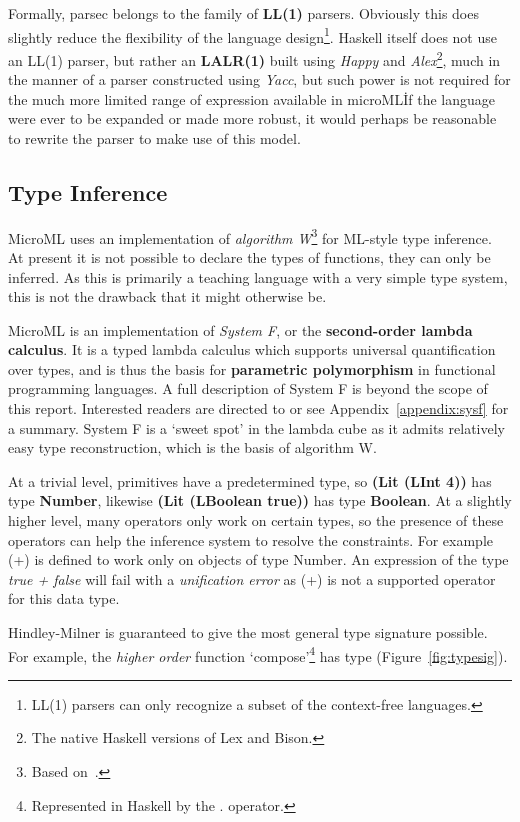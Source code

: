 \documentclass[12pt, a4paper]{report}
\begin{document}
Formally, parsec belongs to the family of \textbf{LL(1)} parsers. Obviously this does slightly
reduce the flexibility of the language design\footnote{LL(1) parsers can only recognize a subset
of the context-free languages.}. Haskell itself does not use an LL(1) parser, but rather an
\textbf{LALR(1)} built using \textit{Happy} and \textit{Alex}\footnote{The native Haskell versions
of Lex and Bison.}, much in the manner of a parser constructed using \textit{Yacc}, but such power
is not required for the much more limited range of expression available in microML\. If the language
were ever to be expanded or made more robust, it would perhaps be reasonable to rewrite the parser
to make use of this model.

\subsection{Type Inference}
\label{sec:type}
MicroML uses an implementation of \textit{algorithm W}\footnote{Based on~\cite{algoW}.}
for ML-style type inference. At present it is not possible to declare the types of functions, they
can only be inferred. As this is primarily a teaching language with a very simple type system, this
is not the drawback that it might otherwise be.

MicroML is an implementation of \textit{System F}, or the \textbf{second-order lambda calculus}.
It is a typed lambda calculus which supports universal quantification over types, and is thus
the basis for \textbf{parametric polymorphism} in functional programming languages. A full
description of System F is beyond the scope of this report. Interested readers are directed to
\cite{Pierce:2002:TPL:509043} or see Appendix~\ref{appendix:sysf} for a summary. System F is a
`sweet spot' in the lambda cube as it admits relatively easy type reconstruction, which is the basis
of algorithm W.

At a trivial level, primitives have a predetermined type, so \textbf{(Lit (LInt 4))} has type
\textbf{Number}, likewise \textbf{(Lit (LBoolean true))} has type \textbf{Boolean}. At a slightly
higher level, many operators only work on certain types, so the presence of these operators can help
the inference system to resolve the constraints. For example (+) is defined to work only on objects
of type Number. An expression of the type \textit{true + false} will fail with a \textit{unification
error} as (+) is not a supported operator for this data type.

Hindley-Milner is guaranteed to give the most general type signature possible. For example, the
\textit{higher order} function `compose'\footnote{Represented in Haskell by the $.$ operator.}
has type (Figure~\ref{fig:typesig}).
\end{document}

